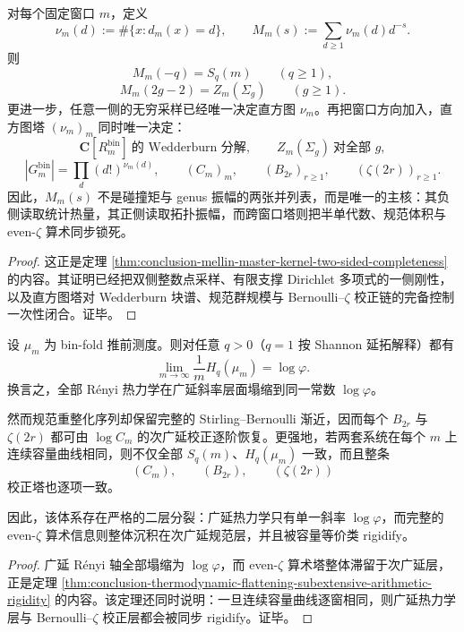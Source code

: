\begin{theorem}\label{thm:conclusion-mellin-master-kernel-arithmetic-topological-complete-object}
对每个固定窗口 \(m\)，定义
\[
\nu_m(d):=\#\{x:d_m(x)=d\},
\qquad
M_m(s):=\sum_{d\ge 1}\nu_m(d)d^{-s}.
\]
则
\[
M_m(-q)=S_q(m)\qquad(q\ge 1),
\]
\[
M_m(2g-2)=Z_m(\Sigma_g)\qquad(g\ge 1).
\]
更进一步，任意一侧的无穷采样已经唯一决定直方图 \(\nu_m\)。再把窗口方向加入，直方图塔 \((\nu_m)_m\) 同时唯一决定：
\[
\mathbf C[R_m^{\mathrm{bin}}]\ \text{的 Wedderburn 分解},
\qquad
Z_m(\Sigma_g)\ \text{对全部 }g,
\]
\[
|G_m^{\mathrm{bin}}|=\prod_d(d!)^{\nu_m(d)},
\qquad
(C_m)_m,\qquad
(B_{2r})_{r\ge 1},\qquad
(\zeta(2r))_{r\ge 1}.
\]
因此，\(M_m(s)\) 不是碰撞矩与 genus 振幅的两张并列表，而是唯一的主核：其负侧读取统计热量，其正侧读取拓扑振幅，而跨窗口塔则把半单代数、规范体积与 even-\(\zeta\) 算术同步锁死。
\end{theorem}
\begin{proof}
这正是定理 \ref{thm:conclusion-mellin-master-kernel-two-sided-completeness} 的内容。其证明已经把双侧整数点采样、有限支撑 Dirichlet 多项式的一侧刚性，以及直方图塔对 Wedderburn 块谱、规范群规模与 Bernoulli--\(\zeta\) 校正链的完备控制一次性闭合。证毕。
\end{proof}

\begin{theorem}\label{thm:conclusion-thermodynamic-flatness-evenzeta-subextensive-reservoir}
设 \(\mu_m\) 为 bin-fold 推前测度。则对任意 \(q>0\)（\(q=1\) 按 Shannon 延拓解释）都有
\[
\lim_{m\to\infty}\frac1m H_q(\mu_m)=\log\varphi.
\]
换言之，全部 R\'enyi 热力学在广延斜率层面塌缩到同一常数 \(\log\varphi\)。

然而规范重整化序列却保留完整的 Stirling--Bernoulli 渐近，因而每个 \(B_{2r}\) 与 \(\zeta(2r)\) 都可由 \(\log C_m\) 的次广延校正逐阶恢复。更强地，若两套系统在每个 \(m\) 上连续容量曲线相同，则不仅全部 \(S_q(m)\)、\(H_q(\mu_m)\) 一致，而且整条
\[
(C_m),\qquad
(B_{2r}),\qquad
(\zeta(2r))
\]
校正塔也逐项一致。

因此，该体系存在严格的二层分裂：广延热力学只有单一斜率 \(\log\varphi\)，而完整的 even-\(\zeta\) 算术信息则整体沉积在次广延规范层，并且被容量等价类 rigidify。
\end{theorem}
\begin{proof}
广延 R\'enyi 轴全部塌缩为 \(\log\varphi\)，而 even-\(\zeta\) 算术塔整体滞留于次广延层，正是定理 \ref{thm:conclusion-thermodynamic-flattening-subextensive-arithmetic-rigidity} 的内容。该定理还同时说明：一旦连续容量曲线逐窗相同，则广延热力学层与 Bernoulli--\(\zeta\) 校正层都会被同步 rigidify。证毕。
\end{proof}

